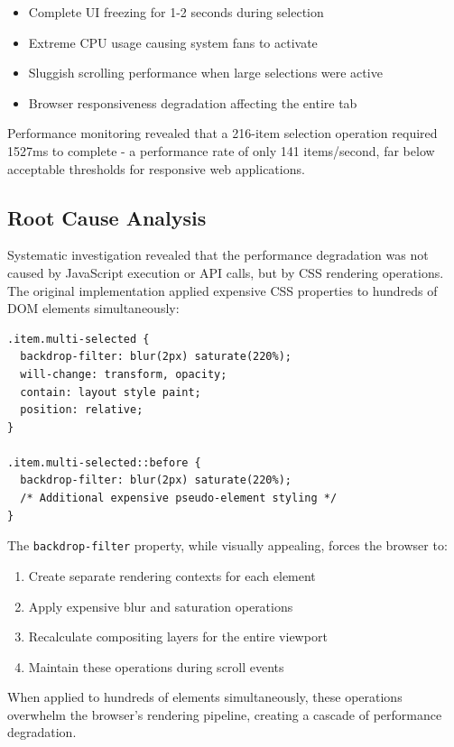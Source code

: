 \documentclass[10pt]{article}
\begin{document}
\begin{itemize}
    \item Complete UI freezing for 1-2 seconds during selection
    \item Extreme CPU usage causing system fans to activate
    \item Sluggish scrolling performance when large selections were active
    \item Browser responsiveness degradation affecting the entire tab
\end{itemize}

Performance monitoring revealed that a 216-item selection operation required 1527ms to complete - a performance rate of only 141 items/second, far below acceptable thresholds for responsive web applications.

\subsection{Root Cause Analysis}

Systematic investigation revealed that the performance degradation was not caused by JavaScript execution or API calls, but by CSS rendering operations. The original implementation applied expensive CSS properties to hundreds of DOM elements simultaneously:

\begin{lstlisting}[caption={Problematic CSS Implementation}]
.item.multi-selected {
  backdrop-filter: blur(2px) saturate(220%);
  will-change: transform, opacity;
  contain: layout style paint;
  position: relative;
}

.item.multi-selected::before {
  backdrop-filter: blur(2px) saturate(220%);
  /* Additional expensive pseudo-element styling */
}
\end{lstlisting}

The \texttt{backdrop-filter} property, while visually appealing, forces the browser to:
\begin{enumerate}
    \item Create separate rendering contexts for each element
    \item Apply expensive blur and saturation operations
    \item Recalculate compositing layers for the entire viewport
    \item Maintain these operations during scroll events
\end{enumerate}

When applied to hundreds of elements simultaneously, these operations overwhelm the browser's rendering pipeline, creating a cascade of performance degradation.
\end{document}
